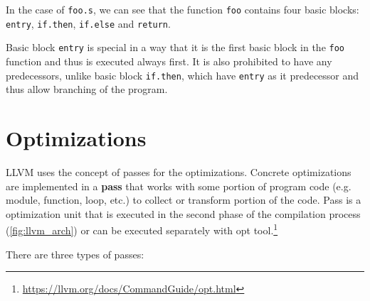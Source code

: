 \documentclass[12pt, twoside]{fithesis2}
\renewcommand{\_}{\leavevmode \kern0.07em\vbox{\hrule width0.4em}}
\begin{document}
In the case of \texttt{foo.s}, we can see that the function
\texttt{foo} contains four basic blocks: \texttt{entry},
\texttt{if.then}, \texttt{if.else} and
\texttt{return}.

Basic block \texttt{entry} is special in a way that it is the first
basic block in the \texttt{foo} function and thus is executed always
first.
It is also prohibited to have any predecessors, unlike basic block
\texttt{if.then}, which have \texttt{entry} as it predecessor
and thus allow branching of the program.

\section{Optimizations}
\label{sec:llvm-opt}

LLVM uses the concept of passes for the optimizations. Concrete optimizations
are implemented in a \textbf{pass} that works with some portion of program code
(e.g.  module, function, loop, etc.) to collect or transform portion of
the code\cite{llvm-passes}.
Pass is a optimization unit that is executed in the second
phase of the compilation process (\autoref{fig:llvm_arch}) or can be executed
separately with opt tool.\footnote{
\url{https://llvm.org/docs/CommandGuide/opt.html}
}

There are three types of passes:
\end{document}
